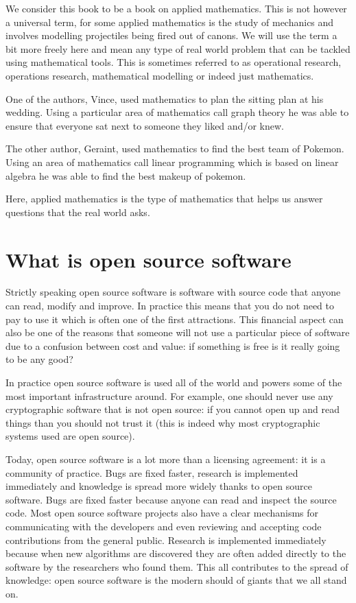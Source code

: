 We consider this book to be a book on applied mathematics. This is not
however a universal term, for some applied mathematics is the study of
mechanics and involves modelling projectiles being fired out of canons.
We will use the term a bit more freely here and mean any type of real
world problem that can be tackled using mathematical tools. This is
sometimes referred to as operational research, operations research,
mathematical modelling or indeed just mathematics.

One of the authors, Vince, used mathematics to plan the sitting plan at
his wedding. Using a particular area of mathematics call graph theory he
was able to ensure that everyone sat next to someone they liked and/or
knew.

The other author, Geraint, used mathematics to find the best team of
Pokemon. Using an area of mathematics call linear programming which is
based on linear algebra he was able to find the best makeup of pokemon.

Here, applied mathematics is the type of mathematics that helps us
answer questions that the real world asks.

\section{What is open source
software}\label{sec:what-is-open-source-software}

Strictly speaking open source software is software with source code that
anyone can read, modify and improve. In practice this means that you do
not need to pay to use it which is often one of the first attractions.
This financial aspect can also be one of the reasons that someone will
not use a particular piece of software due to a confusion between cost
and value: if something is free is it really going to be any good?

In practice open source software is used all of the world and powers
some of the most important infrastructure around. For example, one
should never use any cryptographic software that is not open source: if
you cannot open up and read things than you should not trust it (this is
indeed why most cryptographic systems used are open source).

Today, open source software is a lot more than a licensing agreement:
it is a community of practice. Bugs are fixed faster, research is
implemented immediately and knowledge is spread more widely thanks to
open source software. Bugs are fixed faster because anyone can read and
inspect the source code. Most open source software projects also have a
clear mechanisms for communicating with the developers and even
reviewing and accepting code contributions from the general public.
Research is implemented immediately because when new algorithms are
discovered they are often added directly to the software by the
researchers who found them. This all contributes to the spread of
knowledge: open source software is the modern should of giants that we
all stand on.

